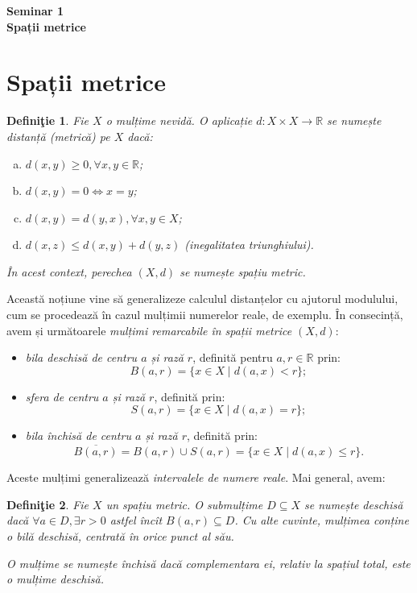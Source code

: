 \documentclass[11pt,a4paper]{article}
\newcommand\seq{\subseteq}
\newcommand\RR{\mathbb{R}}
\theoremstyle{dotless}
\theoremstyle{dotlessdr}
\newtheorem{definition}{Defini\c{t}ie}[section]
\begin{document}
\begin{center}
  {\large\textbf{Seminar 1 \\ Spații metrice}}
\end{center}

\vspace{2cm}


\section{Spații metrice}
\label{sec:sp-metrice}

\begin{definition}\label{def:distanta}
  Fie $X$ o mulțime nevidă. O aplicație $d : X \times X \to \RR$ se numește \emph{distanță}
  (metrică) pe $X$ dacă:
  \begin{enumerate}[(a)]
  \item $d(x, y) \geq 0, \forall x, y \in \RR$;
  \item $d(x, y) = 0 \Leftrightarrow x = y$;
  \item $d(x, y) = d(y, x), \forall x, y \in X$;
  \item $d(x, z) \leq d(x, y) + d(y, z)$ (\emph{inegalitatea triunghiului}).
  \end{enumerate}

  În acest context, perechea $(X, d)$ se numește \emph{spațiu metric}.
\end{definition}

Această noțiune vine să generalizeze calculul distanțelor cu ajutorul modulului,
cum se procedează în cazul mulțimii numerelor reale, de exemplu. În consecință,
avem și următoarele \emph{mulțimi remarcabile în spații metrice $(X, d)$}:
\begin{itemize}
\item \emph{bila deschisă de centru $a$ și rază $r$}, definită pentru $a, r \in \RR$ prin:
  \[
    B(a, r) = \{ x \in X \mid d(a, x) < r \};
  \]
\item \emph{sfera de centru $a$ și rază $r$}, definită prin:
  \[
    S(a, r) = \{ x \in X \mid d(a, x) = r \};
  \]
\item \emph{bila închisă de centru $a$ și rază $r$}, definită prin:
  \[
    \overline{B(a, r)} = B(a, r) \cup S(a, r) = \{x \in X \mid d(a, x) \leq r \}.
  \]
\end{itemize}

Aceste mulțimi generalizează \emph{intervalele de numere reale}. Mai general, avem:
\begin{definition}\label{def:m-deschisa}
  Fie $X$ un spațiu metric. O submulțime $D \seq X$ se numește \emph{deschisă} dacă
  $\forall a \in D, \exists r > 0$ astfel încît $B(a, r) \seq D$. Cu alte cuvinte,
  mulțimea conține o bilă deschisă, centrată în orice punct al său.

  O mulțime se numește \emph{închisă} dacă complementara ei, relativ la spațiul total,
  este o mulțime deschisă.
\end{definition}
\end{document}
